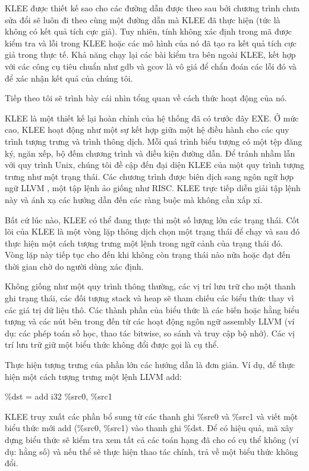 \documentclass[12pt,a4paper]{article}
\begin{document}
\indent KLEE được thiết kế sao cho các đường dẫn được theo sau bởi chương trình chưa sửa đổi sẽ luôn đi theo cùng một đường dẫn mà KLEE đã thực hiện (tức là không có kết quả tích cực giả). Tuy nhiên, tính không xác định trong mã được kiểm tra và lỗi trong KLEE hoặc các mô hình của nó đã tạo ra kết quả tích cực giả trong thực tế. Khả năng chạy lại các bài kiểm tra bên ngoài KLEE, kết hợp với các công cụ tiêu chuẩn như gdb và gcov là vô giá để chẩn đoán các lỗi đó và để xác nhận kết quả của chúng tôi.

\indent Tiếp theo tôi sẽ trình bày cái nhìn tổng quan về cách thức hoạt động của nó.

\indent KLEE là một thiết kế lại hoàn chỉnh của hệ thống đã có trước đây EXE. Ở mức cao, KLEE hoạt động như một sự kết hợp giữa một hệ điều hành cho các quy trình tượng trưng và trình thông dịch. Mỗi quá trình biểu tượng có một tệp đăng ký, ngăn xếp, bộ đếm chương trình và điều kiện đường dẫn. Để tránh nhầm lẫn với quy trình Unix, chúng tôi đề cập đến đại diện KLEE của một quy trình tượng trưng như một trạng thái. Các chương trình được biên dịch sang ngôn ngữ hợp ngữ LLVM \cite{lattner2004llvm}, một tập lệnh ảo giống như RISC. KLEE trực tiếp diễn giải tập lệnh này và ánh xạ các hướng dẫn đến các ràng buộc mà không cần xấp xỉ.

\indent Bất cứ lúc nào, KLEE có thể đang thực thi một số lượng lớn các trạng thái. Cốt lõi của KLEE là một vòng lặp thông dịch chọn một trạng thái để chạy và sau đó thực hiện một cách tượng trưng một lệnh trong ngữ cảnh của trạng thái đó. Vòng lặp này tiếp tục cho đến khi không còn trạng thái nào nữa hoặc đạt đến thời gian chờ do người dùng xác định.

\indent Không giống như một quy trình thông thường, các vị trí lưu trữ cho một thanh ghi trạng thái, các đối tượng stack và heap sẽ tham chiếu các biểu thức  thay vì các giá trị dữ liệu thô. Các thành phần của biểu thức là các biến hoặc hằng biểu tượng và các nút bên trong đến từ các hoạt động ngôn ngữ assembly LLVM (ví dụ: các phép toán số học, thao tác bitwise, so sánh và truy cập bộ nhớ). Các vị trí lưu trữ giữ một biểu thức không đổi được gọi là cụ thể.

\indent Thực hiện tượng trưng của phần lớn các hướng dẫn là đơn giản. Ví dụ, để thực hiện một cách tượng trưng một lệnh LLVM add:

\begin{center}
\%dst = add i32 \%src0, \%src1
\end{center}

\indent KLEE truy xuất các phần bổ sung từ các thanh ghi \%src0 và \%src1 và viết một biểu thức mới add (\%src0, \%src1) vào thanh ghi \%dst. Để có hiệu quả, mã xây dựng biểu thức sẽ kiểm tra xem tất cả các toán hạng đã cho có cụ thể không (ví dụ: hằng số) và nếu  thể sẽ thực hiện thao tác chính, trả về một biểu thức không đổi.
\end{document}
